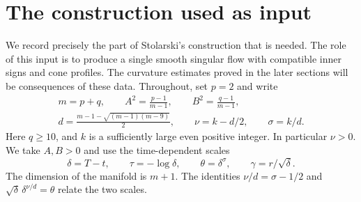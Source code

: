 \section{The construction used as input}\label{sec:construction}

We record precisely the part of Stolarski's construction that is needed.
The role of this input is to produce a single smooth singular flow with
compatible inner signs and cone profiles. The curvature estimates proved
in the later sections will be consequences of these data.
Throughout, set \(p=2\) and write
\begin{equation}\label{eq:parameters}
\begin{gathered}
m=p+q,\qquad A^2=\frac{p-1}{m-1},\qquad B^2=\frac{q-1}{m-1},\\
d=\frac{m-1-\sqrt{(m-1)(m-9)}}2,\qquad
\nu=k-d/2,\qquad \sigma=k/d.
\end{gathered}
\end{equation}
Here \(q\ge10\), and \(k\) is a sufficiently large even positive integer.
In particular \(\nu>0\). We take \(A,B>0\) and use the time-dependent scales
\begin{equation}\label{eq:scales}
\delta=T-t,\qquad \tau=-\log\delta,\qquad
\theta=\delta^\sigma,\qquad \gamma=r/\sqrt\delta.
\end{equation}
The dimension of the manifold is \(m+1\).
The identities \(\nu/d=\sigma-1/2\) and
\(\sqrt\delta\,\delta^{\nu/d}=\theta\) relate the two scales.

